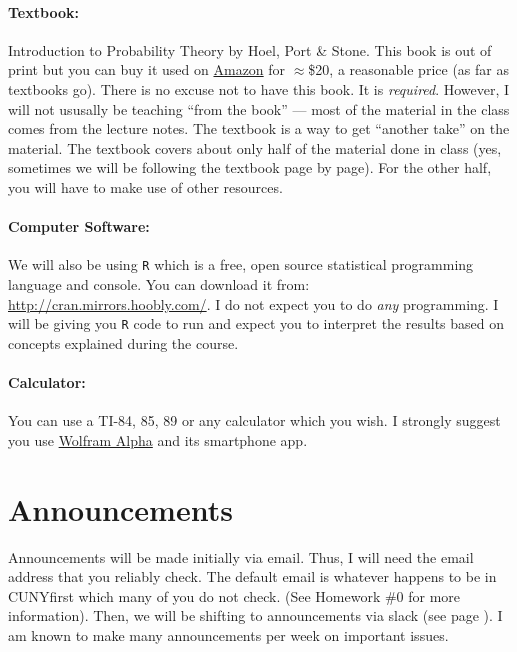 \documentclass[12pt]{article}
\newcommand{\qu}[1]{``#1''}
\begin{document}
\paragraph{Textbook:} Introduction to Probability Theory by Hoel, Port \& Stone. This book is out of print but you can buy it used on \href{https://www.amazon.com/Introduction-Probability-Theory-Paul-Hoel/dp/039504636X/ref=sr_1_1?ie=UTF8&qid=1503515517&sr=8-1&keywords=introduction+to+probability+theory+hoel}{Amazon} for $\approx$\$20, a reasonable price (as far as textbooks go). There is no excuse not to have this book. It is \textit{required}. However, I will not ususally be teaching \qu{from the book} --- most of the material in the class comes from the lecture notes. The textbook is a way to get ``another take'' on the material. The textbook covers about only half of the material done in class (yes, sometimes we will be following the textbook page by page). For the other half, you will have to make use of other resources.

\paragraph{Computer Software:} We will also be using \texttt{R} which is a free, open source statistical programming language and console. You can download it from: \url{http://cran.mirrors.hoobly.com/}. I do not expect you to do \textit{any} programming. I will be giving you \texttt{R} code to run and expect you to interpret the results based on concepts explained during the course.

\paragraph{Calculator:} You can use a TI-84, 85, 89 or any calculator which you wish. I strongly suggest you use \href{http://www.wolframalpha.com/}{Wolfram Alpha} and its smartphone app.

\section*{Announcements}

Announcements will be made initially via email. Thus, I will need the email address that you reliably check. The default email is whatever happens to be in CUNYfirst which many of you do not check. (See Homework \#0 for more information). Then, we will be shifting to announcements via slack (see page \pageref{sec:slack}). I am known to make many announcements per week on important issues. 
\end{document}
